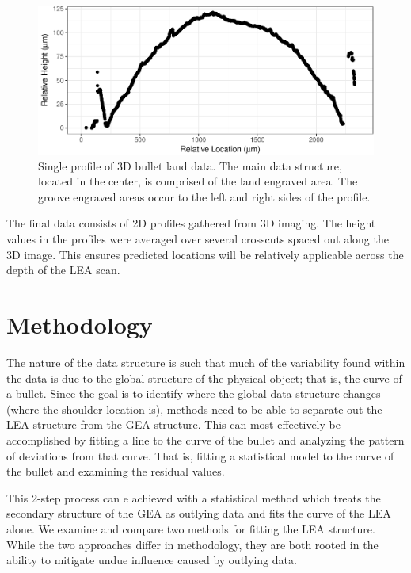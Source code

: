 \documentclass[]{article}
\begin{document}
\begin{figure}
\centering
\includegraphics{writeup_files/figure-latex/unnamed-chunk-2-1.pdf}
\caption{Single profile of 3D bullet land data. The main data structure,
located in the center, is comprised of the land engraved area. The
groove engraved areas occur to the left and right sides of the profile.}
\end{figure}

The final data consists of 2D profiles gathered from 3D imaging. The
height values in the profiles were averaged over several crosscuts
spaced out along the 3D image. This ensures predicted locations will be
relatively applicable across the depth of the LEA scan.

\section{Methodology}

The nature of the data structure is such that much of the variability
found within the data is due to the global structure of the physical
object; that is, the curve of a bullet. Since the goal is to identify
where the global data structure changes (where the shoulder location
is), methods need to be able to separate out the LEA structure from the
GEA structure. This can most effectively be accomplished by fitting a
line to the curve of the bullet and analyzing the pattern of deviations
from that curve. That is, fitting a statistical model to the curve of
the bullet and examining the residual values.

This 2-step process can e achieved with a statistical method which
treats the secondary structure of the GEA as outlying data and fits the
curve of the LEA alone. We examine and compare two methods for fitting
the LEA structure. While the two approaches differ in methodology, they
are both rooted in the ability to mitigate undue influence caused by
outlying data.
\end{document}
